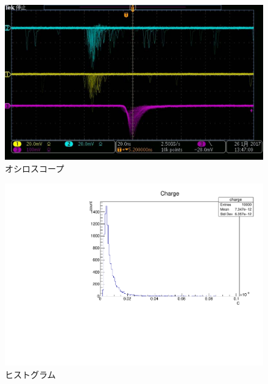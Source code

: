 \begin{figure}[H]
\centering
\includegraphics[keepaspectratio,scale=0.4]{fig/ybm/ocsillo.pdf}
\caption{オシロスコープ}
\label{fig:ocsillo}
\end{figure}

\begin{figure}[H]
\centering
\includegraphics[keepaspectratio,angle=90,scale=0.4]{fig/ybm/charge.pdf}
\caption{ヒストグラム}
\label{fig:charge}
\end{figure}
